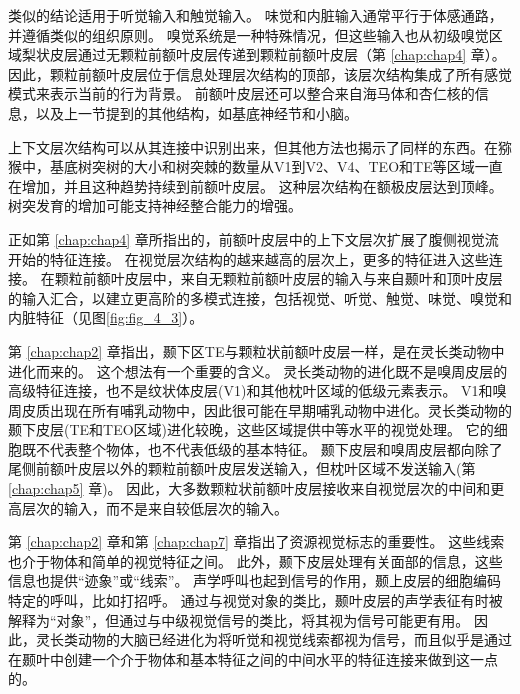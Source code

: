 类似的结论适用于听觉输入\cite{romanski2009primate}和触觉输入\cite{jones1970anatomical}。
味觉和内脏输入通常平行于体感通路，并遵循类似的组织原则。
嗅觉系统是一种特殊情况，但这些输入也从初级嗅觉区域梨状皮层通过无颗粒前额叶皮层传递到颗粒前额叶皮层（第 \ref{chap:chap4} 章）。
因此，颗粒前额叶皮层位于信息处理层次结构的顶部，该层次结构集成了所有感觉模式来表示当前的行为背景。
前额叶皮层还可以整合来自海马体和杏仁核的信息，以及上一节提到的其他结构，如基底神经节和小脑。
\par


上下文层次结构可以从其连接中识别出来，但其他方法也揭示了同样的东西。在猕猴中，基底树突树的大小和树突棘的数量从V1到V2、V4、TEO和TE等区域一直在增加，并且这种趋势持续到前额叶皮层\cite{elston2007specialization}。
这种层次结构在额极皮层达到顶峰。
树突发育的增加可能支持神经整合能力的增强。
\par


正如第 \ref{chap:chap4} 章所指出的，前额叶皮层中的上下文层次扩展了腹侧视觉流开始的特征连接\cite{murray2007visual}。
在视觉层次结构的越来越高的层次上，更多的特征进入这些连接。
在颗粒前额叶皮层中，来自无颗粒前额叶皮层的输入与来自颞叶和顶叶皮层的输入汇合，以建立更高阶的多模式连接，包括视觉、听觉、触觉、味觉、嗅觉和内脏特征（见图\ref{fig:fig_4_3}）。
\par


第 \ref{chap:chap2} 章指出，颞下区TE与颗粒状前额叶皮层一样，是在灵长类动物中进化而来的。
这个想法有一个重要的含义。
灵长类动物的进化既不是嗅周皮层的高级特征连接，也不是纹状体皮层(V1)和其他枕叶区域的低级元素表示。
V1和嗅周皮质出现在所有哺乳动物中，因此很可能在早期哺乳动物中进化。灵长类动物的颞下皮层(TE和TEO区域)进化较晚，这些区域提供中等水平的视觉处理。
它的细胞既不代表整个物体，也不代表低级的基本特征。
颞下皮层和嗅周皮层都向除了尾侧前额叶皮层以外的颗粒前额叶皮层发送输入，但枕叶区域不发送输入(第 \ref{chap:chap5} 章)。
因此，大多数颗粒状前额叶皮层接收来自视觉层次的中间和更高层次的输入，而不是来自较低层次的输入。
\par


第 \ref{chap:chap2} 章和第 \ref{chap:chap7} 章指出了资源视觉标志的重要性。
这些线索也介于物体和简单的视觉特征之间。
此外，颞下皮层处理有关面部的信息\cite{baylis1987functional,tanaka1991coding}，这些信息也提供“迹象”或“线索”。
声学呼叫也起到信号的作用，颞上皮层的细胞编码特定的呼叫，比如打招呼\cite{rauschecker1995processing}。
通过与视觉对象的类比，颞叶皮层的声学表征有时被解释为“对象”，但通过与中级视觉信号的类比，将其视为信号可能更有用。
因此，灵长类动物的大脑已经进化为将听觉和视觉线索都视为信号，而且似乎是通过在颞叶中创建一个介于物体和基本特征之间的中间水平的特征连接来做到这一点的。
\par


